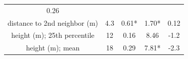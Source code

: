 \documentclass[twoside,12pt,final]{ucthesis-CA2012}
\begin{document}
\begin{ucmainmatter}
\begin{longtable}[]{@{}ccccc@{}}
\begin{minipage}[t]{0.13\columnwidth}
0.26\strut
\end{minipage}\tabularnewline
\begin{minipage}[t]{0.28\columnwidth}\centering\strut
distance to 2nd neighbor (m)\strut
\end{minipage} & \begin{minipage}[t]{0.13\columnwidth}\centering\strut
4.3\strut
\end{minipage} & \begin{minipage}[t]{0.24\columnwidth}\centering\strut
0.61*\strut
\end{minipage} & \begin{minipage}[t]{0.08\columnwidth}\centering\strut
1.70*\strut
\end{minipage} & \begin{minipage}[t]{0.13\columnwidth}\centering\strut
0.12\strut
\end{minipage}\tabularnewline
\begin{minipage}[t]{0.28\columnwidth}\centering\strut
height (m); 25th percentile\strut
\end{minipage} & \begin{minipage}[t]{0.13\columnwidth}\centering\strut
12\strut
\end{minipage} & \begin{minipage}[t]{0.24\columnwidth}\centering\strut
0.16\strut
\end{minipage} & \begin{minipage}[t]{0.08\columnwidth}\centering\strut
8.46\strut
\end{minipage} & \begin{minipage}[t]{0.13\columnwidth}\centering\strut
-1.2\strut
\end{minipage}\tabularnewline
\begin{minipage}[t]{0.28\columnwidth}\centering\strut
height (m); mean\strut
\end{minipage} & \begin{minipage}[t]{0.13\columnwidth}\centering\strut
18\strut
\end{minipage} & \begin{minipage}[t]{0.24\columnwidth}\centering\strut
0.29\strut
\end{minipage} & \begin{minipage}[t]{0.08\columnwidth}\centering\strut
7.81*\strut
\end{minipage} & \begin{minipage}[t]{0.13\columnwidth}\centering\strut
-2.3\strut
\end{minipage}\tabularnewline

\end{longtable}
\end{ucmainmatter}
\end{document}
